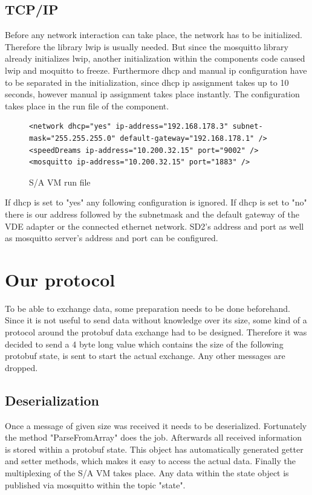 \documentclass[paper=a4, fontsize=11pt]{scrreprt}
\begin{document}
  \subsection{TCP/IP} \label{ar_tcpip}
Before any network interaction can take place, the network has to be initialized. Therefore the library lwip is usually needed. But since the mosquitto library already initializes lwip, another initialization within the components code caused lwip and moquitto to freeze.\newline
Furthermore dhcp and manual ip configuration have to be separated in the initialization, since dhcp ip assignment takes up to 10 seconds, however manual ip assignment takes place instantly.
The configuration takes place in the run file of the component.
\begin{figure}[!h]
  \centering
    \begin{verbatim}
<network dhcp="yes" ip-address="192.168.178.3" subnet-mask="255.255.255.0" default-gateway="192.168.178.1" />
<speedDreams ip-address="10.200.32.15" port="9002" />
<mosquitto ip-address="10.200.32.15" port="1883" />
    \end{verbatim}
    \caption{S/A VM run file}
  \end{figure}
\newpage
If dhcp is set to "yes" any following configuration is ignored.\newline
If dhcp is set to "no" there is our address followed by the subnetmask and the default gateway of the VDE adapter or the connected ethernet network.\newline
SD2's address and port as well as mosquitto server's address and port can be configured.
  \section{Our protocol} \label{ar_ourprotocol}
To be able to exchange data, some preparation needs to be done beforehand. Since it is not useful to send data without knowledge over its size, some kind of a protocol around the protobuf data exchange had to be designed. Therefore it was decided to send a 4 byte long value which contains the size of the following protobuf state, is sent to start the actual exchange. Any other messages are dropped.
  \subsection{Deserialization}
Once a message of given size was received it needs to be deserialized. Fortunately the method "ParseFromArray" does the job. Afterwards all received information is stored within a protobuf state. This object has automatically generated getter and setter methods, which makes it easy to access the actual data. Finally the multiplexing of the S/A VM takes place. Any data within the state object is published via mosquitto within the topic "state".
\end{document}
